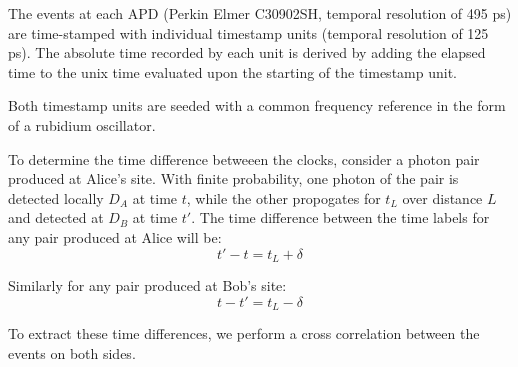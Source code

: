 \documentclass[aps,pra,onecolumn, superscriptaddress]{revtex4}
\begin{document}
The events at each APD (Perkin Elmer C30902SH, temporal resolution of 495 ps) are time-stamped with individual timestamp units (temporal resolution of 125 ps). The absolute time recorded by each unit is derived by adding the elapsed time to the unix time evaluated upon the starting of the timestamp unit. 

Both timestamp units are seeded with a common frequency reference in the form of a rubidium oscillator.

To determine the time difference betweeen the clocks, consider a photon pair produced at Alice's site. With finite probability, one photon of the pair is detected locally $D_A$ at time $t$, while the other propogates for $t_L$ over distance $L$ and detected at $D_B$ at time $t'$. The time difference between the time labels for any pair produced at Alice will be: 
\begin{equation}
t'-t=t_L + \delta
\end{equation}

Similarly for any pair produced at Bob's site:
\begin{equation}
t-t'=t_L - \delta
\end{equation}

To extract these time differences, we perform a cross correlation between the events on both sides. 
\end{document}
